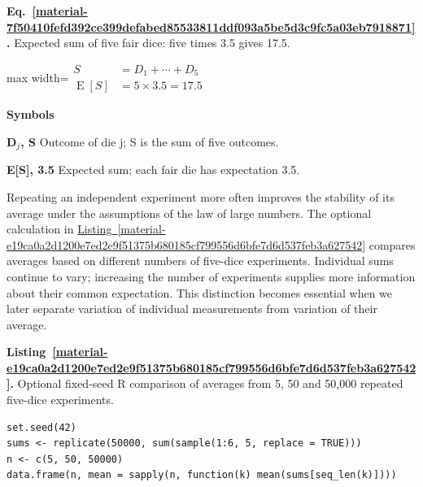 \documentclass[11pt,a4paper]{article}
\newcounter{listing}
\begin{document}
\par\medskip
\begin{samepage}
\label{material-7f50410fefd392ce399defabed85533811ddf093a5be5d3c9fc5a03eb7918871}
\noindent\textbf{Eq.~\ref*{material-7f50410fefd392ce399defabed85533811ddf093a5be5d3c9fc5a03eb7918871}.} Expected sum of five fair dice: five times 3.5 gives 17.5.\par\nopagebreak
\begin{center}\begin{adjustbox}{max width=\linewidth}$\displaystyle \begin{aligned}S&=D_1+\cdots+D_5\\\operatorname{E}[S]&=5\times3.5=17.5\end{aligned}$\end{adjustbox}\end{center}

\par\noindent\textbf{Symbols}

\par\noindent\textbf{D\ensuremath{{}_j}, S} Outcome of die j; S is the sum of five outcomes.

\par\noindent\textbf{E[S], 3.5} Expected sum; each fair die has expectation 3.5.

\end{samepage}
\medskip

Repeating an independent experiment more often improves the stability of its average under the assumptions of the law of large numbers. The optional calculation in \hyperref[material-e19ca0a2d1200e7ed2e9f51375b680185cf799556d6bfe7d6d537feb3a627542]{Listing~\ref*{material-e19ca0a2d1200e7ed2e9f51375b680185cf799556d6bfe7d6d537feb3a627542}} compares averages based on different numbers of five-dice experiments. Individual sums continue to vary; increasing the number of experiments supplies more information about their common expectation. This distinction becomes essential when we later separate variation of individual measurements from variation of their average.


\par\medskip
{}
\label{material-e19ca0a2d1200e7ed2e9f51375b680185cf799556d6bfe7d6d537feb3a627542}
\noindent\textbf{Listing~\ref*{material-e19ca0a2d1200e7ed2e9f51375b680185cf799556d6bfe7d6d537feb3a627542}.} Optional fixed-seed R comparison of averages from 5, 50 and 50,000 repeated five-dice experiments.\par\nopagebreak
\begin{Verbatim}[fontsize=\footnotesize,breaklines=true,breakanywhere=true]
set.seed(42)
sums <- replicate(50000, sum(sample(1:6, 5, replace = TRUE)))
n <- c(5, 50, 50000)
data.frame(n, mean = sapply(n, function(k) mean(sums[seq_len(k)])))
\end{Verbatim}
\end{document}

